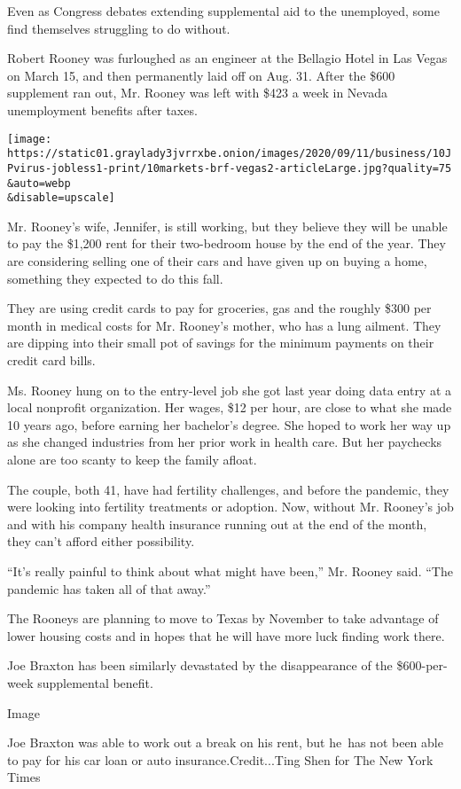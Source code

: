 Even as Congress debates extending supplemental aid to the unemployed,
some find themselves struggling to do without.

Robert Rooney was furloughed as an engineer at the Bellagio Hotel in Las
Vegas on March 15, and then permanently laid off on Aug. 31. After the
\$600 supplement ran out, Mr. Rooney was left with \$423 a week in
Nevada unemployment benefits after taxes.

\texttt{[image: https://static01.graylady3jvrrxbe.onion/images/2020/09/11/business/10JPvirus-jobless1-print/10markets-brf-vegas2-articleLarge.jpg?quality=75\\\&auto=webp\\\&disable=upscale]}

Mr. Rooney's wife, Jennifer, is still working, but they believe they
will be unable to pay the \$1,200 rent for their two-bedroom house by
the end of the year. They are considering selling one of their cars and
have given up on buying a home, something they expected to do this fall.

They are using credit cards to pay for groceries, gas and the roughly
\$300 per month in medical costs for Mr. Rooney's mother, who has a lung
ailment. They are dipping into their small pot of savings for the
minimum payments on their credit card bills.

Ms. Rooney hung on to the entry-level job she got last year doing data
entry at a local nonprofit organization. Her wages, \$12 per hour, are
close to what she made 10 years ago, before earning her bachelor's
degree. She hoped to work her way up as she changed industries from her
prior work in health care. But her paychecks alone are too scanty to
keep the family afloat.

The couple, both 41, have had fertility challenges, and before the
pandemic, they were looking into fertility treatments or adoption. Now,
without Mr. Rooney's job and with his company health insurance running
out at the end of the month, they can't afford either possibility.

``It's really painful to think about what might have been,'' Mr. Rooney
said. ``The pandemic has taken all of that away.''

The Rooneys are planning to move to Texas by November to take advantage
of lower housing costs and in hopes that he will have more luck finding
work there.

Joe Braxton has been similarly devastated by the disappearance of the
\$600-per-week supplemental benefit.

Image

Joe Braxton was able to work out a break on his rent, but he~has not
been able to pay for his car loan or auto insurance.Credit...Ting Shen
for The New York Times

